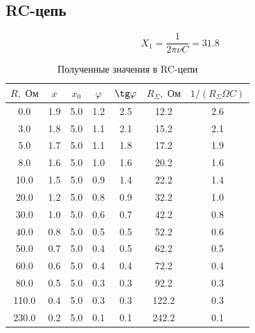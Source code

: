 \documentclass[a4paper, 12pt]{article}
\begin{document}
\subsection*{RC-цепь}

$$X_1 = \dfrac{1}{2 \pi \nu C} = 31.8$$

\begin{table}[H]
\centering
\begin{tabular}{|c|c|c|c|c|c|c|}
\hline
$R, \text{ Ом}$ & $x$ & $x_0$ & $\varphi$ & $\tg \varphi$ & $R_{\Sigma}, \text{ Ом}$ & $1/(R_{\Sigma} \Omega C)$ \\ \hline
0.0             & 1.9 & 5.0   & 1.2   & 2.5        & 12.2                  & 2.6                   \\ \hline
3.0             & 1.8 & 5.0   & 1.1   & 2.1        & 15.2                  & 2.1                   \\ \hline
5.0             & 1.7 & 5.0   & 1.1   & 1.8        & 17.2                  & 1.9                   \\ \hline
8.0             & 1.6 & 5.0   & 1.0   & 1.6        & 20.2                  & 1.6                   \\ \hline
10.0            & 1.5 & 5.0   & 0.9   & 1.4        & 22.2                  & 1.4                   \\ \hline
20.0            & 1.2 & 5.0   & 0.8   & 0.9        & 32.2                  & 1.0                   \\ \hline
30.0            & 1.0 & 5.0   & 0.6   & 0.7        & 42.2                  & 0.8                   \\ \hline
40.0            & 0.8 & 5.0   & 0.5   & 0.5        & 52.2                  & 0.6                   \\ \hline
50.0            & 0.7 & 5.0   & 0.4   & 0.5        & 62.2                  & 0.5                   \\ \hline
60.0            & 0.6 & 5.0   & 0.4   & 0.4        & 72.2                  & 0.4                   \\ \hline
80.0            & 0.5 & 5.0   & 0.3   & 0.3        & 92.2                  & 0.3                   \\ \hline
110.0           & 0.4 & 5.0   & 0.3   & 0.3        & 122.2                 & 0.3                   \\ \hline
230.0           & 0.2 & 5.0   & 0.1   & 0.1        & 242.2                 & 0.1                   \\ \hline
\end{tabular}
\caption{Полученные значения в RC-цепи}
\end{table}
\end{document}
